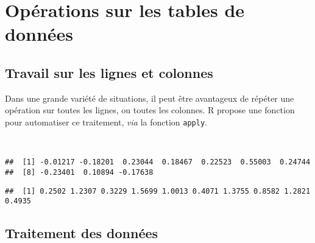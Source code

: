 \chapter{Opérations sur les tables de données\label{c:tables}}

\section{Travail sur les lignes et colonnes}

Dans une grande variété de situations, il peut être avantageux de répéter une opération sur toutes les lignes, ou toutes les colonnes.
R propose une fonction pour automatiser ce traitement, \emph{via} la fonction \texttt{apply}. 

\begin{knitrout}
\color{fgcolor}\begin{kframe}
\begin{flushleft}
\ttfamily\noindent
{}\hlassignement{\usebox{\hlnormalsizeboxlessthan}-}{\ }\hlkeyword{(}\hlkeyword{(}\hlkeyword{)}\hlkeyword{,}{\ }\hlargument{=}{\ }\hlkeyword{)}\hspace*{\fill}\\
\hlstd{}\hlkeyword{(}\hlkeyword{,}{\ }\hlkeyword{,}{\ }\hlkeyword{)}\mbox{}
\normalfont
\end{flushleft}
\begin{verbatim}
##  [1] -0.01217 -0.18201  0.23044  0.18467  0.22523  0.55003  0.24744
##  [8] -0.23401  0.10894 -0.17638
\end{verbatim}
\begin{flushleft}
\ttfamily\noindent
{}\hlkeyword{(}\hlkeyword{,}{\ }\hlkeyword{,}{\ }\hlkeyword{)}\mbox{}
\normalfont
\end{flushleft}
\begin{verbatim}
##  [1] 0.2502 1.2307 0.3229 1.5699 1.0013 0.4071 1.3755 0.8582 1.2821 0.4935
\end{verbatim}
\end{kframe}
\end{knitrout}


\section{Traitement des données}

